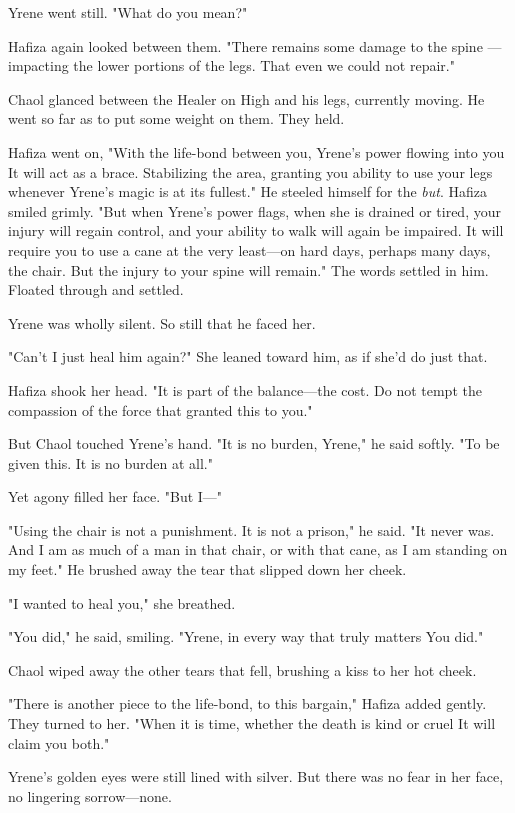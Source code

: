 Yrene went still. "What do you mean?"

Hafiza again looked between them. "There remains some damage to the spine ---impacting the lower portions of the legs. That even we could not repair."

Chaol glanced between the Healer on High and his legs, currently moving. He went so far as to put some weight on them. They held.

Hafiza went on, "With the life-bond between you, Yrene's power flowing into you  It will act as a brace. Stabilizing the area, granting you ability to use your legs whenever Yrene's magic is at its fullest." He steeled himself for the \emph{but}. Hafiza smiled grimly. "But when Yrene's power flags, when she is drained or tired, your injury will regain control, and your ability to walk will again be impaired. It will require you to use a cane at the very least---on hard days, perhaps many days, the chair. But the injury to your spine will remain." The words settled in him. Floated through and settled.

Yrene was wholly silent. So still that he faced her.

"Can't I just heal him again?" She leaned toward him, as if she'd do just that.

Hafiza shook her head. "It is part of the balance---the cost. Do not tempt the compassion of the force that granted this to you."

But Chaol touched Yrene's hand. "It is no burden, Yrene," he said softly. "To be given this. It is no burden at all."

Yet agony filled her face. "But I---"

"Using the chair is not a punishment. It is not a prison," he said. "It never was. And I am as much of a man in that chair, or with that cane, as I am standing on my feet." He brushed away the tear that slipped down her cheek.

"I wanted to heal you," she breathed.

"You did," he said, smiling. "Yrene, in every way that truly matters
 You did."

Chaol wiped away the other tears that fell, brushing a kiss to her hot cheek.

"There is another piece to the life-bond, to this bargain," Hafiza added gently. They turned to her. "When it is time, whether the death is kind or cruel  It will claim you both."

Yrene's golden eyes were still lined with silver. But there was no fear in her face, no lingering sorrow---none.


